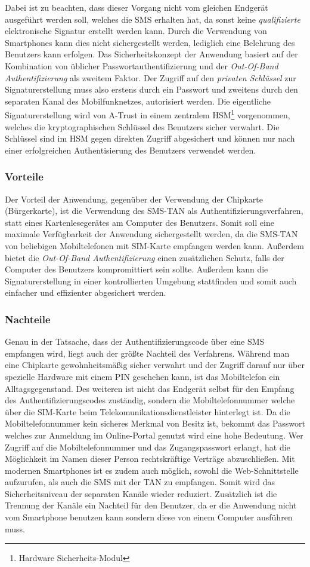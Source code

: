 \documentclass[11pt,a4paper,ngerman]{scrreprt}
\begin{document}
Dabei ist zu beachten, dass dieser Vorgang nicht vom gleichen Endgerät ausgeführt werden soll, welches die SMS erhalten hat, da sonst keine \emph{qualifizierte} elektronische Signatur erstellt werden kann. Durch die Verwendung von Smartphones kann dies nicht sichergestellt werden, lediglich eine Belehrung des Benutzers kann erfolgen. Das Sicherheitskonzept der Anwendung basiert auf der Kombination von üblicher Passwortauthentifizierung und der \emph{Out-Of-Band Authentifizierung} als zweitem Faktor. Der Zugriff auf den \emph{privaten Schlüssel} zur Signaturerstellung muss also erstens durch ein Passwort und zweitens durch den separaten Kanal des Mobilfunknetzes, autorisiert werden. Die eigentliche Signaturerstellung wird von A-Trust in einem zentralem HSM\footnote{Hardware Sicherheits-Modul} vorgenommen, welches die kryptographischen Schlüssel des Benutzers sicher verwahrt. Die Schlüssel sind im HSM gegen direkten Zugriff abgesichert und können nur nach einer erfolgreichen Authentisierung des Benutzers verwendet werden.
\subsubsection{Vorteile}
Der Vorteil der Anwendung, gegenüber der Verwendung der Chipkarte (Bürgerkarte), ist die Verwendung des SMS-TAN als Authentifizierungsverfahren, statt eines Kartenlesegerätes am Computer des Benutzers. Somit soll eine maximale Verfügbarkeit der Anwendung sichergestellt werden, da die SMS-TAN von beliebigen Mobiltelefonen mit SIM-Karte empfangen werden kann. Außerdem bietet die \emph{Out-Of-Band Authentifizierung} einen zusätzlichen Schutz, falls der Computer des Benutzers kompromittiert sein sollte. Außerdem kann die Signaturerstellung in einer kontrollierten Umgebung stattfinden und somit auch einfacher und effizienter abgesichert werden.
\subsubsection{Nachteile}
Genau in der Tatsache, dass der Authentifizierungscode über eine SMS empfangen wird, liegt auch der größte Nachteil des Verfahrens. Während man eine Chipkarte gewohnheitsmäßig sicher verwahrt und der Zugriff darauf nur über spezielle Hardware mit einem PIN geschehen kann, ist das Mobiltelefon ein Alltagsgegenstand. Des weiteren ist nicht das Endgerät selbst für den Empfang des Authentifizierungscodes zuständig, sondern die Mobiltelefonnummer welche über die SIM-Karte beim Telekomunikationsdienstleister hinterlegt ist. Da die Mobiltelefonnummer kein sicheres Merkmal von Besitz ist, bekommt das Passwort welches zur Anmeldung im Online-Portal genutzt wird eine hohe Bedeutung. Wer Zugriff auf die Mobiltelefonnummer und das Zugangspasswort erlangt, hat die Möglichkeit im Namen dieser Person rechtskräftige Verträge abzuschließen. Mit modernen Smartphones ist es zudem auch möglich, sowohl die Web-Schnittstelle aufzurufen, als auch die SMS mit der TAN zu empfangen. Somit wird das Sicherheitsniveau der separaten Kanäle wieder reduziert. Zusätzlich ist die Trennung der Kanäle ein Nachteil für den Benutzer, da er die Anwendung nicht vom Smartphone benutzen kann sondern diese von einem Computer ausführen muss.
\end{document}
